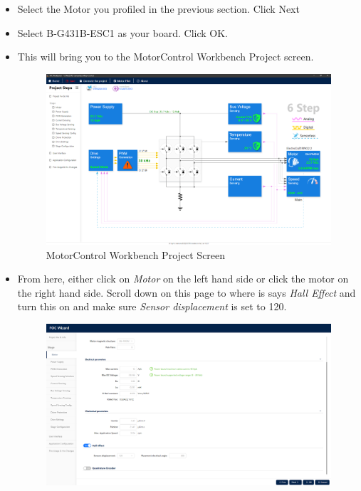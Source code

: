 \documentclass[10pt]{article}
\begin{document}
\begin{itemize}
\begin{figure}[H]
                    \end{figure}
                \item Select the Motor you profiled in the previous section. Click Next
                \item Select B-G431B-ESC1 as your board. Click OK.
                \item This will bring you to the MotorControl Workbench Project screen.
                    \begin{figure}[H]
                        \centerline{\includegraphics[width=\textwidth]{References/MCW Project Screen.png}}
                        \caption{MotorControl Workbench Project Screen}
                    \end{figure}
                \item From here, either click on \emph{Motor} on the left hand side or click the motor on the right hand side. Scroll down on this page to where is says \emph{Hall Effect} and turn this on and make sure \emph{Sensor displacement} is set to 120.
                    \begin{figure}[H]
                        \centerline{\includegraphics[width=\textwidth]{References/MCW FOC Hall-Effect Motor.png}}

\end{figure}
\end{itemize}
\end{document}
